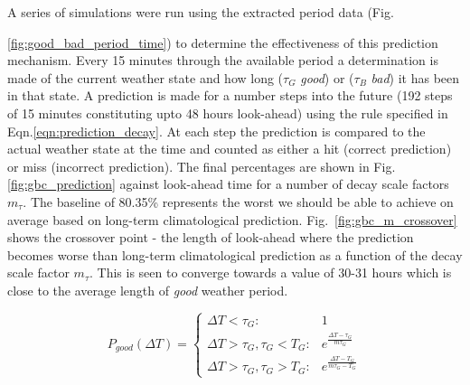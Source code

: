 \documentclass[12pt,a4paper]{article}
\begin{document}
A series of simulations were run using the extracted period data (Fig. {\ref{fig:good_bad_period_time}) to determine the effectiveness of this prediction mechanism. Every 15 minutes through the available period a determination is made of the current weather state and how long ($\tau_G$ \emph{good}) or ($\tau_B$ \emph{bad}) it has been in that state. A prediction is made for a number steps into the future (192 steps of 15 minutes constituting upto 48 hours look-ahead) using the rule specified in Eqn.\ref{eqn:prediction_decay}. At each step the prediction is compared to the actual weather state at the time and counted as either a hit (correct prediction) or miss (incorrect prediction). The final percentages are shown in Fig. \ref{fig:gbc_prediction} against look-ahead time for a number of decay scale factors $m_{\tau}$. The baseline of 80.35\% represents the worst we should be able to achieve on average based on long-term climatological prediction. Fig.~\ref{fig:gbc_m_crossover} shows the crossover point - the length of look-ahead where the prediction becomes worse than long-term climatological prediction as a function of the decay scale factor $m_{\tau}$. This is seen to converge towards a value of 30-31 hours which is close to the average length of \emph{good} weather period.

\begin{equation}
\label{eqn:prediction_decay}
P_{good}(\Delta T) = 
\begin{cases} 
\Delta T < \tau_G : & 1   \\ 
\Delta T > \tau_G, \tau_G < T_G : & e^{\frac{\Delta T-\tau_G}{m \tau_G}} \\
\Delta T > \tau_G , \tau_G > T_G : & e^{\frac{\Delta T-T_G}{m \tau_G-T_G}}
\end{cases}
\end{equation}


}
\end{document}

